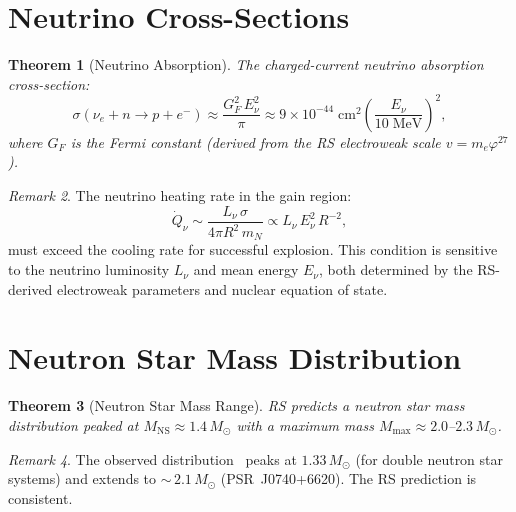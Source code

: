 \documentclass[12pt,a4paper]{article}
\newtheorem{theorem}{Theorem}[section]
\theoremstyle{definition}
\theoremstyle{remark}
\newtheorem{remark}[theorem]{Remark}
\begin{document}
\section{Neutrino Cross-Sections}
\label{sec:cross-sections}

\begin{theorem}[Neutrino Absorption]
The charged-current neutrino absorption cross-section:
\begin{equation}
  \sigma(\nu_e + n \to p + e^-) \approx \frac{G_F^2\,E_\nu^2}
  {\pi} \approx 9 \times 10^{-44}\;\mathrm{cm^2}
  \left(\frac{E_\nu}{10\;\mathrm{MeV}}\right)^2,
\end{equation}
where $G_F$ is the Fermi constant (derived from the RS electroweak
scale $v = m_e \varphi^{27}$).
\end{theorem}

\begin{remark}
The neutrino heating rate in the gain region:
\begin{equation}
  \dot{Q}_\nu \sim \frac{L_\nu\,\sigma}{4\pi R^2\,m_N}
  \propto L_\nu\,E_\nu^2\,R^{-2},
\end{equation}
must exceed the cooling rate for successful explosion.  This
condition is sensitive to the neutrino luminosity $L_\nu$ and mean
energy $E_\nu$, both determined by the RS-derived electroweak
parameters and nuclear equation of state.
\end{remark}

\section{Neutron Star Mass Distribution}
\label{sec:ns-mass}

\begin{theorem}[Neutron Star Mass Range]
RS predicts a neutron star mass distribution peaked at
$M_{\mathrm{NS}} \approx 1.4\,M_\odot$ with a maximum mass
$M_{\mathrm{max}} \approx 2.0$--$2.3\,M_\odot$.
\end{theorem}

\begin{remark}
The observed distribution~\cite{Ozel2016} peaks at $1.33\,M_\odot$
(for double neutron star systems) and extends to
${\sim}\,2.1\,M_\odot$ (PSR~J0740+6620).  The RS prediction is
consistent.
\end{remark}
\end{document}
